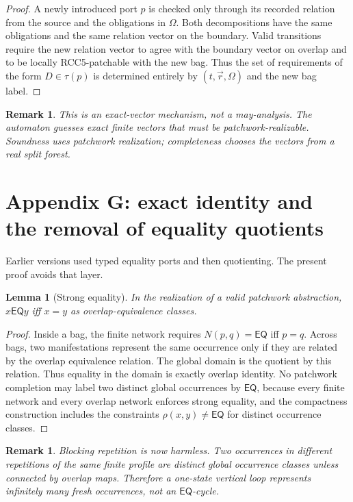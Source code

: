 \documentclass[11pt]{article}
\newtheorem{lemma}[theorem]{Lemma}
\newtheorem{remark}[theorem]{Remark}
\newcommand{\EQ}{\mathsf{EQ}}
\begin{document}
\begin{proof}
A newly introduced port $p$ is checked only through its recorded relation from the source and the obligations in $\Omega$.  Both decompositions have the same obligations and the same relation vector on the boundary.  Valid transitions require the new relation vector to agree with the boundary vector on overlap and to be locally RCC5-patchable with the new bag.  Thus the set of requirements of the form $D\in\tau(p)$ is determined entirely by $(t,\vec r,\Omega)$ and the new bag label.
\end{proof}

\begin{remark}
This is an exact-vector mechanism, not a may-analysis.  The automaton guesses exact finite vectors that must be patchwork-realizable.  Soundness uses patchwork realization; completeness chooses the vectors from a real split forest.
\end{remark}

\section{Appendix G: exact identity and the removal of equality quotients}

Earlier versions used typed equality ports and then quotienting.  The present proof avoids that layer.

\begin{lemma}[Strong equality]
In the realization of a valid patchwork abstraction, $x\EQ y$ iff $x=y$ as overlap-equivalence classes.
\end{lemma}

\begin{proof}
Inside a bag, the finite network requires $N(p,q)=\EQ$ iff $p=q$.  Across bags, two manifestations represent the same occurrence only if they are related by the overlap equivalence relation.  The global domain is the quotient by this relation.  Thus equality in the domain is exactly overlap identity.  No patchwork completion may label two distinct global occurrences by $\EQ$, because every finite network and every overlap network enforces strong equality, and the compactness construction includes the constraints $\rho(x,y)\ne\EQ$ for distinct occurrence classes.
\end{proof}

\begin{remark}
Blocking repetition is now harmless.  Two occurrences in different repetitions of the same finite profile are distinct global occurrence classes unless connected by overlap maps.  Therefore a one-state vertical loop represents infinitely many fresh occurrences, not an $\EQ$-cycle.
\end{remark}
\end{document}
